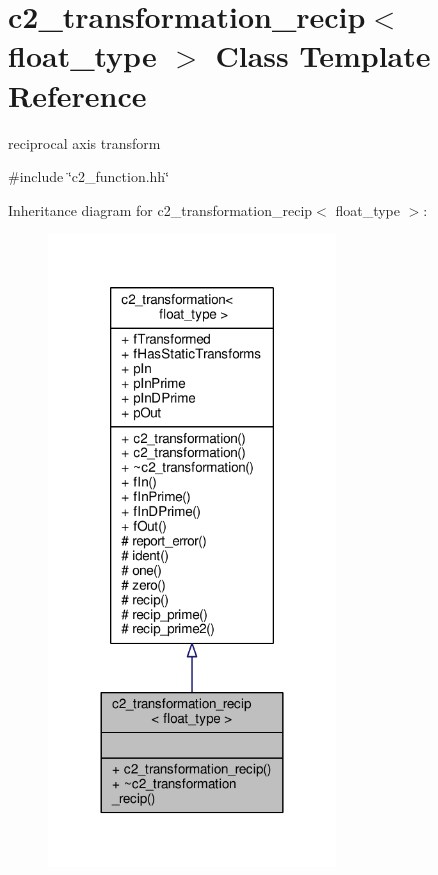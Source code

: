 \hypertarget{classc2__transformation__recip}{}\section{c2\+\_\+transformation\+\_\+recip$<$ float\+\_\+type $>$ Class Template Reference}
\label{classc2__transformation__recip}


reciprocal axis transform  




{\ttfamily \#include \char`\"{}c2\+\_\+function.\+hh\char`\"{}}



Inheritance diagram for c2\+\_\+transformation\+\_\+recip$<$ float\+\_\+type $>$\+:
\nopagebreak
\begin{figure}[H]
\begin{center}
\leavevmode
\includegraphics[width=216pt]{classc2__transformation__recip__inherit__graph}
\end{center}
\end{figure}


